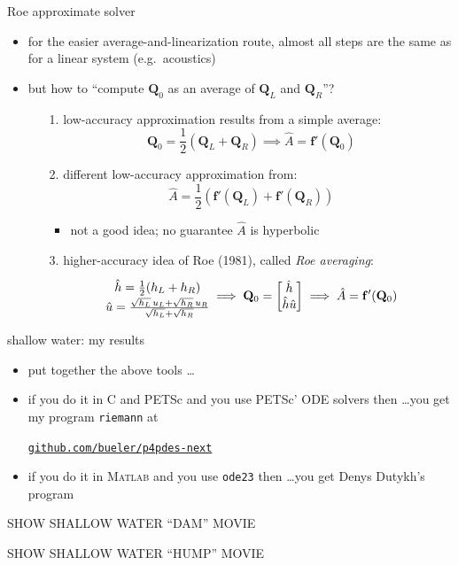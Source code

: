 \documentclass[10pt,dvipsnames,usepdftitle=false,
hyperref={pdftitle = {Finite volume methods},
    pdfauthor = {Ed Bueler}}]{beamer}
\newcommand{\bbf}{\mathbf{f}}
\newcommand{\bQ}{\mathbf{Q}}
\newcommand{\Matlab}{\textsc{Matlab}\xspace}
\begin{document}
\begin{frame}{Roe approximate solver}

\begin{itemize}
\item for the easier average-and-linearization route, almost all steps are the same as for a linear system (e.g.~acoustics)
\item but how to ``compute $\bQ_0$ as an average of $\bQ_L$ and $\bQ_R$''?
    \begin{itemize}
    \item[1.] low-accuracy approximation results from a simple average:
        $$\bQ_0 = \frac{1}{2} \left(\bQ_L + \bQ_R\right) \implies \hat A = \bbf'(\bQ_0)$$
    \item[2.] different low-accuracy approximation from:
        $$\hat A = \frac{1}{2} \left(\bbf'(\bQ_L) + \bbf'(\bQ_R)\right)$$

        \begin{itemize}
        \item not a good idea; no guarantee $\hat A$ is hyperbolic
        \end{itemize}
    \item[3.] higher-accuracy idea of Roe (1981), called \emph{Roe averaging}:
        $$\begin{matrix} \hat h = \frac{1}{2} (h_L + h_R) {\Large\strut} \\
\hat u = \frac{\sqrt{h_L}\, u_L + \sqrt{h_R}\, u_R}{\sqrt{h_L} + \sqrt{h_R}}
\end{matrix}
\implies \bQ_0 = \begin{bmatrix} \hat h \\ \hat h \hat u \end{bmatrix} \implies \hat A = \bbf'(\bQ_0)$$
    \end{itemize}
\end{itemize}
\end{frame}


\begin{frame}{shallow water: my results}

\begin{itemize}
\item put together the above tools \dots
\item if you do it in C and PETSc and you use PETSc' ODE solvers then \dots you get my program \texttt{riemann} at
    \begin{center}
    \href{https://github.com/bueler/p4pdes-next}{\texttt{github.com/bueler/p4pdes-next}}
    \end{center}
\item if you do it in \Matlab and you use \texttt{ode23} then \dots you get Denys Dutykh's program
\end{itemize}

\vspace{10mm}
\begin{center}
\alert{SHOW SHALLOW WATER ``DAM'' MOVIE}

\bigskip
\alert{SHOW SHALLOW WATER ``HUMP'' MOVIE}
\end{center}
\end{frame}
\end{document}

